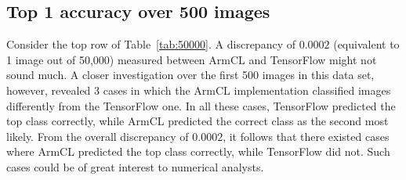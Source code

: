 \documentclass[sigplan]{acmart}
\begin{document}
\subsection{Top 1 accuracy over 500 images}

Consider the top row of Table~\ref{tab:50000}.
%
A discrepancy of $0.0002$ (equivalent to 1 image out of 50,000) measured between ArmCL and TensorFlow might not sound much.
%
A closer investigation over the first 500 images in this data set, however,
revealed 3 cases in which the ArmCL implementation classified images
differently from the TensorFlow one.
%
In all these cases, TensorFlow predicted the top class correctly, while ArmCL predicted
the correct class as the second most likely.
%
From the overall discrepancy of $0.0002$, it follows that there existed cases
where ArmCL predicted the top class correctly, while TensorFlow did not.
%
Such cases could be of great interest to numerical analysts.
%
\end{document}
